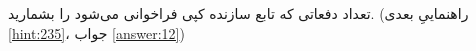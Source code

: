 \section{}
\paragraph{}\label{hint:125}
تعداد دفعاتی که تابع سازنده کپی فراخوانی می‌شود را بشمارید. (راهنماییِ بعدی \ref{hint:235}، جواب \ref{answer:12})